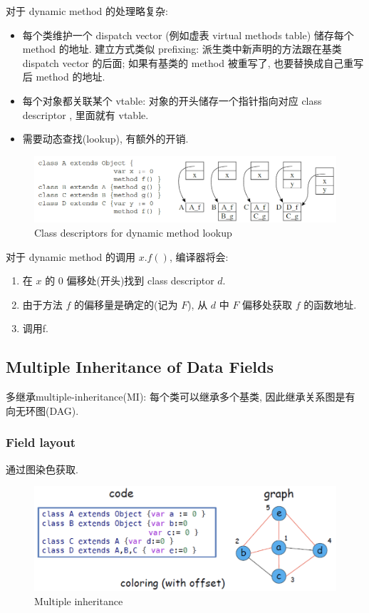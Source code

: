 对于 dynamic method 的处理略复杂:
\begin{itemize}
    \item 每个类维护一个 dispatch vector (例如虚表 virtual methods table) 储存每个 method 的地址. 
    \subitem 建立方式类似 prefixing: 派生类中新声明的方法跟在基类 dispatch vector 的后面; 如果有基类的 method 被重写了, 也要替换成自己重写后 method 的地址. 
    \item 每个对象都关联某个 vtable: 对象的开头储存一个指针指向对应 class descriptor , 里面就有 vtable. 
    \item 需要动态查找(lookup), 有额外的开销. 
\end{itemize}

\begin{figure}[H]
    \centering
    \includegraphics[width=0.84\linewidth]{pic/CP14/Class descriptors for dynamic method lookup}
    \caption{Class descriptors for dynamic method lookup}
\end{figure}

对于 dynamic method 的调用 $x.f()$, 编译器将会: 
\begin{enumerate}
    \item 在 $x$ 的 0 偏移处(开头)找到 class descriptor $d$.
    \item 由于方法 $f$ 的偏移量是确定的(记为 $F$), 从 $d$ 中 $F$ 偏移处获取 $f$ 的函数地址. 
    \item 调用f.
\end{enumerate}

\subsection{Multiple Inheritance of Data Fields}
多继承multiple-inheritance(MI): 每个类可以继承多个基类, 因此继承关系图是有向无环图(DAG).

\subsubsection{Field layout}
通过图染色获取. 

\begin{figure}[H]
    \centering
    \includegraphics[width=0.84\linewidth]{pic/CP14/Multiple inheritance}
    \caption{Multiple inheritance}
    \label{fig:Multiple inheritance}
\end{figure}

